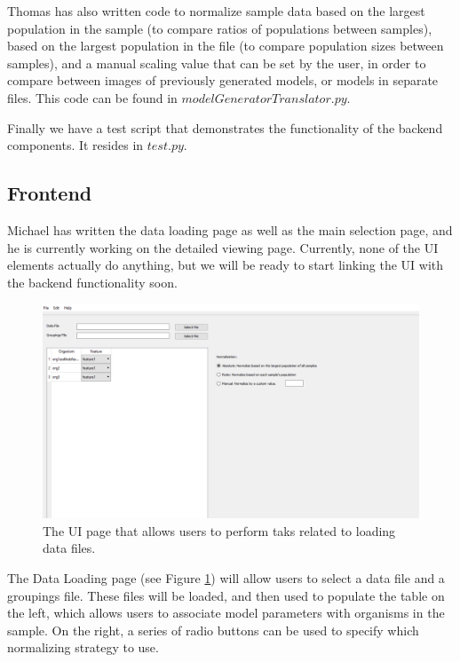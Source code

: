 \documentclass[letterpaper,10pt, onecolumn]{IEEEtran}
\begin{document}
Thomas has also written code to normalize sample data based on the largest population in the sample (to compare ratios of populations between samples), based on the largest population in the file (to compare population sizes between samples), and a manual scaling value that can be set by the user, in order to compare between images of previously generated models, or models in separate files. This code can be found in $modelGeneratorTranslator.py$.

Finally we have a test script that demonstrates the functionality of the backend components. It resides in $test.py$.

\subsection*{Frontend}

Michael has written the data loading page as well as the main selection page, and he is currently working on the detailed viewing page. Currently, none of the UI elements actually do anything, but we will be ready to start linking the UI with the backend functionality soon.

\begin{figure}
	\includegraphics[width=\textwidth]{LoadingInterface}
	\caption{The UI page that allows users to perform taks related to loading data files.}
	\label{fig:LoadingInterface}
\end{figure}

The Data Loading page (see Figure \ref{fig:LoadingInterface}) will allow users to select a data file and a groupings file. These files will be loaded, and then used to populate the table on the left, which allows users to associate model parameters with organisms in the sample. On the right, a series of radio buttons can be used to specify which normalizing strategy to use.
\end{document}
